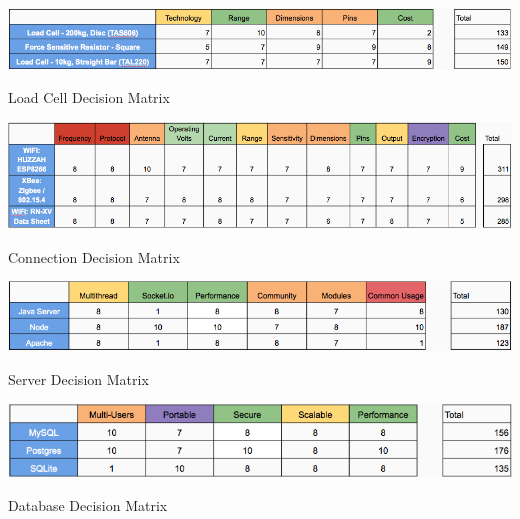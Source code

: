 \documentclass[12pt]{article}
\begin{document}
\begin{appendix}
  \begin{table}[!htb]
    \includegraphics[width=\textwidth]{Figures/DecisionMatrixLoadCell}
    \caption{Load Cell Decision Matrix}
     \label{tabl:DecLoadCell}
  \end{table}

  \begin{table}[!htb]
    \includegraphics[width=\textwidth]{Figures/DecisionMatrixConnection}
    \caption{Connection Decision Matrix}
     \label{tabl:DecConnection}
  \end{table}

  \begin{table}[!htb]
    \includegraphics[width=\textwidth]{Figures/DecisionMatrixServer}
    \caption{Server Decision Matrix}
     \label{tabl:DecServer}
  \end{table}

  \begin{table}[!htb]
    \includegraphics[width=\textwidth]{Figures/DecisionMatrixDatabase}
    \caption{Database Decision Matrix}
     \label{tabl:DecDatabase}
  \end{table}

\end{appendix}
\newpage





\end{document}
